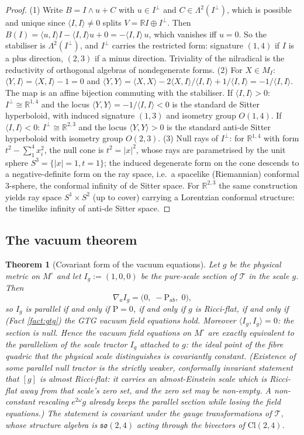 \documentclass[11pt]{article}
\newtheorem{theorem}{Theorem}[section]
\theoremstyle{definition}
\newcommand{\Cl}{\mathrm{Cl}}
\newcommand{\R}{\mathbb{R}}
\newcommand{\Sch}{\mathrm{P}}
\newcommand{\ip}[2]{\langle #1, #2\rangle}
\begin{document}
\begin{proof}
(1) Write $B = I \wedge u + C$ with $u \in I^\perp$ and $C \in \Lambda^2(I^\perp)$, which is possible and unique since $\ip{I}{I} \neq 0$ splits $V = \R I \oplus I^\perp$. Then $B(I) = \ip{u}{I}I - \ip{I}{I}u + 0 = -\ip{I}{I}\,u$, which vanishes iff $u = 0$. So the stabiliser is $\Lambda^2(I^\perp)$, and $I^\perp$ carries the restricted form: signature $(1,4)$ if $I$ is a plus direction, $(2,3)$ if a minus direction. Triviality of the nilradical is the reductivity of orthogonal algebras of nondegenerate forms. (2) For $X \in M_I$: $\ip{Y}{I} = \ip{X}{I} - 1 = 0$ and $\ip{Y}{Y} = \ip{X}{X} - 2\ip{X}{I}/\ip{I}{I} + 1/\ip{I}{I} = -1/\ip{I}{I}$. The map is an affine bijection commuting with the stabiliser. If $\ip{I}{I} > 0$: $I^\perp \cong \R^{1,4}$ and the locus $\ip{Y}{Y} = -1/\ip{I}{I} < 0$ is the standard de Sitter hyperboloid, with induced signature $(1,3)$ and isometry group $O(1,4)$. If $\ip{I}{I} < 0$: $I^\perp \cong \R^{2,3}$ and the locus $\ip{Y}{Y} > 0$ is the standard anti-de Sitter hyperboloid with isometry group $O(2,3)$. (3) Null rays of $I^\perp$: for $\R^{1,4}$ with form $t^2 - \sum_1^4 x_i^2$, the null cone is $t^2 = |x|^2$, whose rays are parametrised by the unit sphere $S^3 = \{|x| = 1, t = 1\}$; the induced degenerate form on the cone descends to a negative-definite form on the ray space, i.e.\ a spacelike (Riemannian) conformal $3$-sphere, the conformal infinity of de Sitter space. For $\R^{2,3}$ the same construction yields ray space $S^1 \times S^2$ (up to cover) carrying a Lorentzian conformal structure: the timelike infinity of anti-de Sitter space.
\end{proof}

\subsection{The vacuum theorem}\label{subsec:vacuumthm}

\begin{theorem}[Covariant form of the vacuum equations]\label{thm:parallel}
Let $g$ be the physical metric on $M^\circ$ and let $I_g := (1, 0, 0)$ be the pure-scale section of $\mathcal{T}$ in the scale $g$. Then
\[
\nabla_a I_g = \bigl(0,\; -\Sch_{ab},\; 0\bigr),
\]
so $I_g$ is parallel if and only if $\Sch = 0$, if and only if $g$ is Ricci-flat, if and only if (Fact \ref{fact:gtg}) the GTG vacuum field equations hold. Moreover $\ip{I_g}{I_g} = 0$: the section is null. Hence the vacuum field equations on $M^\circ$ are exactly equivalent to the parallelism of the scale tractor $I_g$ attached to $g$: the ideal point of the fibre quadric that the physical scale distinguishes is covariantly constant. (Existence of \emph{some} parallel null tractor is the strictly weaker, conformally invariant statement that $[g]$ is almost Ricci-flat: it carries an almost-Einstein scale which is Ricci-flat away from that scale's zero set, and the zero set may be non-empty. A non-constant rescaling $e^{2\omega}g$ already keeps the parallel section while losing the field equations.) The statement is covariant under the gauge transformations of $\mathcal{T}$, whose structure algebra is $\mathfrak{so}(2,4)$ acting through the bivectors of $\Cl(2,4)$.
\end{theorem}
\end{document}
